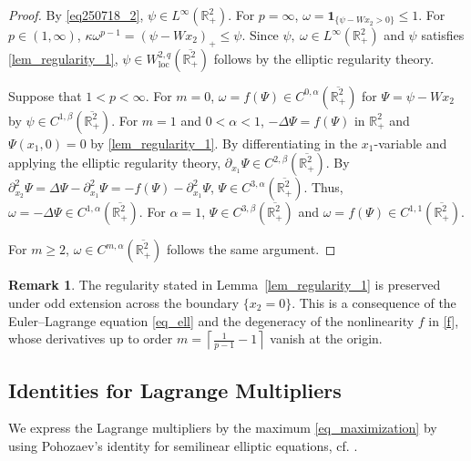 \documentclass[11pt]{amsart}
\theoremstyle{definition}
\theoremstyle{definition}
\newtheorem{remark}[theorem]{Remark}
\numberwithin{equation}{section}
\newcommand{\0}{\emptyset}
\newcommand{\bbR}{\mathbb R}
\begin{document}
			
			\begin{proof}
				By \eqref{eq250718_2}, $\psi\in L^{\infty}(\mathbb{R}^{2}_{+})$. For $p=\infty$, $\omega =\mathbf{1}_{\{\psi-Wx_2>0\}}\leq 1$. For $p \in (1, \infty)$, $\kappa \omega^{p-1}=(\psi-Wx_2)_{+}\leq \psi$. Since $\psi,\ \omega\in L^{\infty}(\mathbb{R}^{2}_{+})$ and $\psi$ satisfies \eqref{lem_regularity_1}, $\psi\in  W^{2,q}_{\mathrm{loc}}(\overline{\bbR^2_{+}})$ follows by the elliptic regularity theory. 
				
				Suppose that $1<p<\infty$. For $m=0$, $\omega=f(\Psi)\in C^{0,\alpha}(\overline{\mathbb{R}^{2}_{+}})$ for $\Psi=\psi-Wx_2$ by $\psi\in C^{1,\beta}(\overline{\mathbb{R}^{2}_{+}})$. For $m=1$ and $0<\alpha<1$, $-\Delta \Psi=f(\Psi)$ in $\mathbb{R}^{2}_{+}$ and $\Psi(x_1,0)=0$ by \eqref{lem_regularity_1}. By differentiating in the $x
				_1$-variable and applying the elliptic regularity theory, $\partial_{x_1}\Psi\in C^{2,\beta}(\overline{\mathbb{R}^{2}_{+}})$. By $\partial_{x_2}^{2}\Psi=\Delta \Psi-\partial_{x_1}^{2}\Psi=-f(\Psi)-\partial_{x_1}^{2}\Psi$, $\Psi\in C^{3,\alpha}(\overline{\mathbb{R}^{2}_{+}})$. Thus, $\omega=-\Delta \Psi\in C^{1,\alpha}(\overline{\mathbb{R}^{2}_{+}})$. For $\alpha=1$, $\Psi\in C^{3,\beta}(\overline{\mathbb{R}^{2}_{+}})$ and $\omega=f(\Psi)\in C^{1,1}(\overline{\mathbb{R}^{2}_{+}})$. 
				
				For $m\geq 2$, $\omega\in C^{m,\alpha}(\overline{\mathbb{R}^{2}_{+}})$ follows the same argument.
			\end{proof}
			
			
			\begin{remark}\label{rmk_reg_odd}
				The regularity stated in Lemma~\ref{lem_regularity_1} is preserved under odd extension across the boundary $\{x_2 = 0\}$.
				This is a consequence of the Euler--Lagrange equation \eqref{eq_ell} and the degeneracy of the nonlinearity $f$ in \eqref{f}, whose derivatives up to order $m = \left\lceil \frac{1}{p-1} - 1 \right\rceil$ vanish at the origin.
			\end{remark}
			
			
			\subsection{Identities for Lagrange Multipliers}
			
			We express the Lagrange multipliers by the maximum \eqref{eq_maximization} by using Pohozaev's identity for semilinear elliptic equations, cf. \cite[Theorem 5.1]{QS07}.
			
\end{document}
